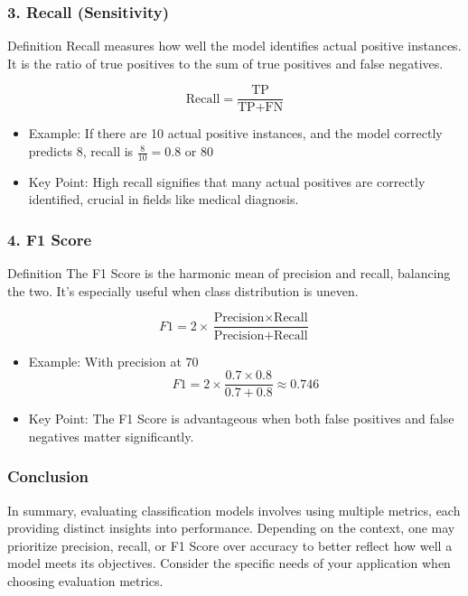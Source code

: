 \documentclass{beamer}
\begin{document}
\begin{frame}[fragile]
    \frametitle{3. Recall (Sensitivity)}
    \begin{block}{Definition}
    Recall measures how well the model identifies actual positive instances. It is the ratio of true positives to the sum of true positives and false negatives.
    \end{block}

    \begin{equation}
    \text{Recall} = \frac{\text{TP}}{\text{TP} + \text{FN}}
    \end{equation}
    
    \begin{itemize}
        \item Example: If there are 10 actual positive instances, and the model correctly predicts 8, recall is \( \frac{8}{10} = 0.8 \) or 80%
        \item Key Point: High recall signifies that many actual positives are correctly identified, crucial in fields like medical diagnosis.
    \end{itemize}
\end{frame}

\begin{frame}[fragile]
    \frametitle{4. F1 Score}
    \begin{block}{Definition}
    The F1 Score is the harmonic mean of precision and recall, balancing the two. It's especially useful when class distribution is uneven.
    \end{block}

    \begin{equation}
    F1 = 2 \times \frac{\text{Precision} \times \text{Recall}}{\text{Precision} + \text{Recall}}
    \end{equation}
    
    \begin{itemize}
        \item Example: With precision at 70%
        \[
        F1 = 2 \times \frac{0.7 \times 0.8}{0.7 + 0.8} \approx 0.746
        \]
        \item Key Point: The F1 Score is advantageous when both false positives and false negatives matter significantly.
    \end{itemize}
\end{frame}

\begin{frame}[fragile]
    \frametitle{Conclusion}
    In summary, evaluating classification models involves using multiple metrics, each providing distinct insights into performance. Depending on the context, one may prioritize precision, recall, or F1 Score over accuracy to better reflect how well a model meets its objectives. 
    Consider the specific needs of your application when choosing evaluation metrics.
\end{frame}
\end{document}
